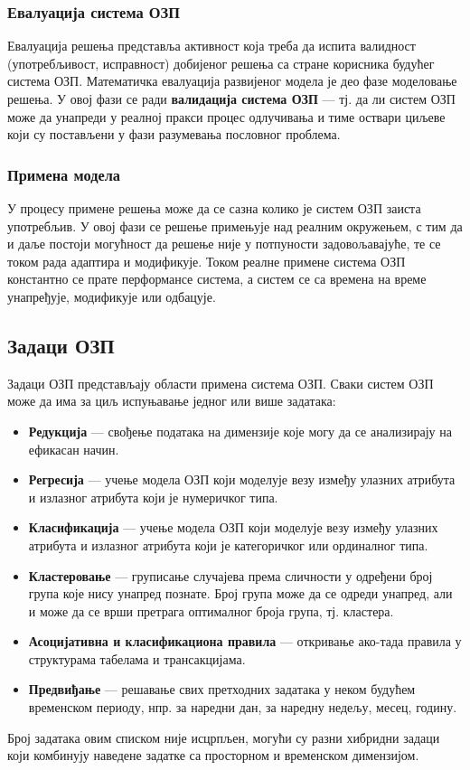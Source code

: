 \subsubsection{Евалуација система ОЗП}
Евалуација решења представља активност која треба да испита валидност (употребљивост, исправност) добијеног решења са стране корисника будућег система ОЗП. Математичка евалуација развијеног модела је део фазе моделовање решења. У овој фази се ради \textbf{валидација система ОЗП} — тј. да ли систем ОЗП може да унапреди у реалној пракси процес одлучивања и тиме оствари циљеве који су постављени у фази разумевања пословног проблема.

\subsubsection{Примена модела}
У процесу примене решења може да се сазна колико је систем ОЗП заиста употребљив. У овој фази се решење примењује над реалним окружењем, с тим да и даље постоји могућност да решење није у потпуности задовољавајуће, те се током рада адаптира и модификује. Током реалне примене система ОЗП константно се прате перформансе система, а систем се са времена на време унапређује, модификује или одбацује.

\subsection{Задаци ОЗП}
Задаци ОЗП представљају области примена система ОЗП. Сваки систем ОЗП може да има за циљ испуњавање једног или више задатака:

\begin{itemize}
  \item \textbf{Редукција} — свођење података на димензије које могу да се анализирају на ефикасан начин.
  \item \textbf{Регресија} — учење модела ОЗП који моделује везу између улазних атрибута и излазног атрибута који је нумеричког типа.
  \item \textbf{Класификација} — учење модела ОЗП који моделује везу између улазних атрибута и излазног атрибута који је категоричког или ординалног типа.
  \item \textbf{Кластеровање} — груписање случајева према сличности у одређени број група које нису унапред познате. Број група може да се одреди унапред, али и може да се врши претрага оптималног броја група, тј. кластера.
  \item \textbf{Асоцијативна и класификациона правила} — откривање ако-тада правила у структурама табелама и трансакцијама.
  \item \textbf{Предвиђање} — решавање свих претходних задатака у неком будућем временском периоду, нпр. за наредни дан, за наредну недељу, месец, годину.
\end{itemize}
Број задатака овим списком није исцрпљен, могући су разни хибридни задаци који комбинују наведене задатке са просторном и временском димензијом.

